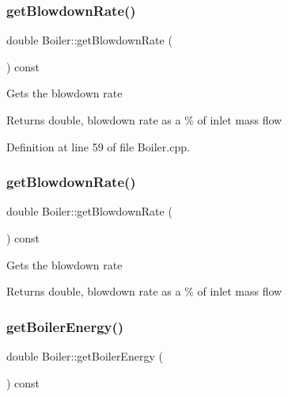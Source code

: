\subsubsection{\texorpdfstring{get\+Blowdown\+Rate()}{getBlowdownRate()}\hspace{0.1cm}{\footnotesize\ttfamily [2/3]}}
{\footnotesize\ttfamily double Boiler\+::get\+Blowdown\+Rate (\begin{DoxyParamCaption}{ }\end{DoxyParamCaption}) const}

Gets the blowdown rate \begin{DoxyReturn}{Returns}
double, blowdown rate as a \% of inlet mass flow 
\end{DoxyReturn}


Definition at line 59 of file Boiler.\+cpp.

\mbox{\label{class_boiler_aec9bf6eeed82d8d5f35284c65a3986e7}} 
\subsubsection{\texorpdfstring{get\+Blowdown\+Rate()}{getBlowdownRate()}\hspace{0.1cm}{\footnotesize\ttfamily [3/3]}}
{\footnotesize\ttfamily double Boiler\+::get\+Blowdown\+Rate (\begin{DoxyParamCaption}{ }\end{DoxyParamCaption}) const}

Gets the blowdown rate \begin{DoxyReturn}{Returns}
double, blowdown rate as a \% of inlet mass flow 
\end{DoxyReturn}
\mbox{\label{class_boiler_a8cc9ad5f1b36f5dcbcb225e9e3d13a39}} 
\subsubsection{\texorpdfstring{get\+Boiler\+Energy()}{getBoilerEnergy()}\hspace{0.1cm}{\footnotesize\ttfamily [1/3]}}
{\footnotesize\ttfamily double Boiler\+::get\+Boiler\+Energy (\begin{DoxyParamCaption}{ }\end{DoxyParamCaption}) const\hspace{0.3cm}{\ttfamily [inline]}}

